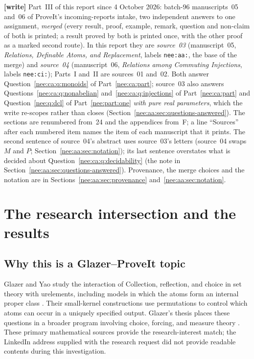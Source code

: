 \documentclass[11pt,letterpaper]{article}
\numberwithin{equation}{section}
\theoremstyle{plain}
\theoremstyle{definition}
\theoremstyle{remark}
\begin{document}
{\footnotesize\noindent\textbf{[write]} Part~III of this report since 4 October 2026: batch-96 manuscripts~05 and~06 of ProveIt's incoming-reports intake, two independent answers to one assignment, \emph{merged} (every result, proof, example, remark, question and non-claim of both is printed; a result proved by both is printed once, with the other proof as a marked second route). In this report they are \emph{source~03} (manuscript~05, \emph{Relations, Definable Atoms, and Replacement}, labels \texttt{nee:aa:}, the base of the merge) and \emph{source~04} (manuscript~06, \emph{Relations among Commuting Injections}, labels \texttt{nee:ci:}); Parts~I and~II are sources~01 and~02. Both answer Question~\ref{nee:ca:q:monoids} of Part~\ref{nee:ca:part}; source~03 also answers Questions~\ref{nee:ca:q:nonabelian} and~\ref{nee:ca:q:injections} of Part~\ref{nee:ca:part} and Question~\ref{nee:q:dcl} of Part~\ref{nee:part:one} \emph{with pure real parameters}, which the write re-scopes rather than closes (Section~\ref{nee:aa:sec:questions-answered}). The sections are renumbered from~24 and the appendices from~F; a line ``Sources'' after each numbered item names the item of each manuscript that it prints. The second sentence of source~04's abstract uses source~03's letters (source~04 swaps $M$ and $P$; Section~\ref{nee:aa:sec:notation}); its last sentence overstates what is decided about Question~\ref{nee:ca:q:decidability} (the note in Section~\ref{nee:aa:sec:questions-answered}). Provenance, the merge choices and the notation are in Sections~\ref{nee:aa:sec:provenance} and~\ref{nee:aa:sec:notation}.\par}

\section{The research intersection and the results}\label{nee:aa:sec:intro}
\label{nee:ci:sec:introduction}

\subsection{Why this is a Glazer--ProveIt topic}

Glazer and Yao study the interaction of Collection, reflection, and choice in
set theory with urelements, including models in which the atoms form an internal
proper class \cite{GY2026}. Their small-kernel constructions use permutations to
control which atoms can occur in a uniquely specified output. Glazer's thesis
places these questions in a broader program involving choice, forcing, and
measure theory \cite{GlazerThesis}. These primary mathematical sources provide
the research-interest match; the LinkedIn address supplied with the research
request did not provide readable contents during this investigation.
\end{document}
